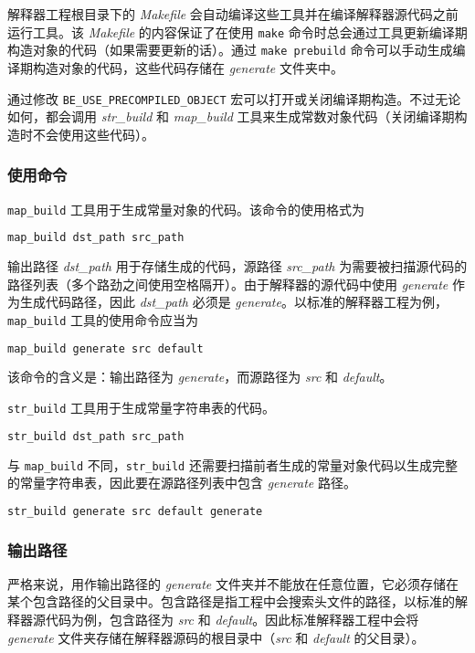 解释器工程根目录下的 \textsl{Makefile} 会自动编译这些工具并在编译解释器源代码之前运行工具。该 \textsl{Makefile} 的内容保证了在使用 \texttt{make} 命令时总会通过工具更新编译期构造对象的代码（如果需要更新的话）。通过 \texttt{make prebuild} 命令可以手动生成编译期构造对象的代码，这些代码存储在 \textsl{generate} 文件夹中。

通过修改 \texttt{BE\_USE\_PRECOMPILED\_OBJECT} 宏可以打开或关闭编译期构造。不过无论如何，都会调用 \textsl{str\_build} 和 \textsl{map\_build} 工具来生成常数对象代码（关闭编译期构造时不会使用这些代码）。

\subsubsection{使用命令}

\texttt{map\_build} 工具用于生成常量对象的代码。该命令的使用格式为
\begin{lstlisting}[language=bash, numbers=none]
map_build dst_path src_path
\end{lstlisting}
输出路径 \textsl{dst\_path} 用于存储生成的代码，源路径 \textsl{src\_path} 为需要被扫描源代码的路径列表（多个路劲之间使用空格隔开）。由于解释器的源代码中使用 \textsl{generate} 作为生成代码路径，因此 \textsl{dst\_path} 必须是 \textsl{generate}。以标准的解释器工程为例，\texttt{map\_build} 工具的使用命令应当为
\begin{lstlisting}[language=bash, numbers=none]
map_build generate src default
\end{lstlisting}
该命令的含义是：输出路径为 \textsl{generate}，而源路径为 \textsl{src} 和 \textsl{default}。

\texttt{str\_build} 工具用于生成常量字符串表的代码。
\begin{lstlisting}[language=bash, numbers=none]
str_build dst_path src_path
\end{lstlisting}
与 \texttt{map\_build} 不同，\texttt{str\_build} 还需要扫描前者生成的常量对象代码以生成完整的常量字符串表，因此要在源路径列表中包含 \textsl{generate} 路径。
\begin{lstlisting}[language=bash, numbers=none]
str_build generate src default generate
\end{lstlisting}

\subsubsection{输出路径}

严格来说，用作输出路径的 \textsl{generate} 文件夹并不能放在任意位置，它必须存储在某个包含路径的父目录中。包含路径是指工程中会搜索头文件的路径，以标准的解释器源代码为例，包含路径为 \textsl{src} 和 \textsl{default}。因此标准解释器工程中会将 \textsl{generate} 文件夹存储在解释器源码的根目录中（\textsl{src} 和 \textsl{default} 的父目录）。

